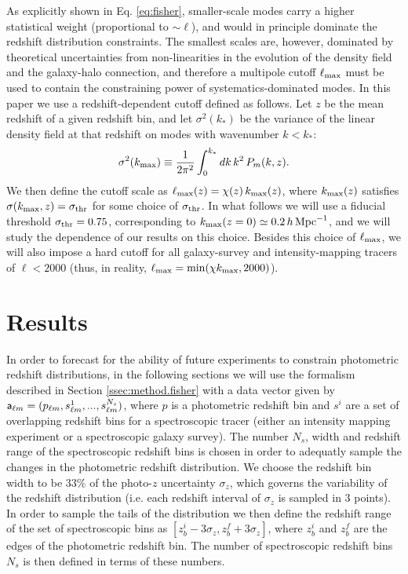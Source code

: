 \documentclass[prd,twocolumn]{revtex4}
\begin{document}
    As explicitly shown in Eq. \ref{eq:fisher}, smaller-scale modes carry a higher statistical
    weight (proportional to $\sim\ell$), and would in principle dominate the redshift
    distribution constraints. The smallest scales are, however, dominated by theoretical
    uncertainties from non-linearities in the evolution of the density field and the galaxy-halo
    connection, and therefore a multipole cutoff $\ell_{\rm max}$ must be used to contain
    the constraining power of systematics-dominated modes. In this paper we use a
    redshift-dependent cutoff defined as follows. Let $z$ be the mean redshift of a given
    redshift bin, and let $\sigma^2(k_*)$ be the variance of the linear density field
    at that redshift on modes with wavenumber $k<k_*$:
    \begin{equation}
      \sigma^2(k_{\rm max})\equiv\frac{1}{2\pi^2}\int_0^{k_*}dk\,k^2\,P_m(k,z).
    \end{equation}
    We then define the cutoff scale as $\ell_{\rm max}(z)=\chi(z)\,k_{\rm max}(z)$,
    where $k_{\rm max}(z)$ satisfies $\sigma(k_{\rm max},z)=\sigma_{\rm thr}$ for some
    choice of $\sigma_{\rm thr}$. In what follows we will use a fiducial threshold
    $\sigma_{\rm thr}=0.75$, corresponding to $k_{\rm max}(z=0)\simeq0.2\,h\,{\rm Mpc}^{-1}$,
    and we will study the dependence of our results on this choice. Besides this choice of
    $\ell_{\rm max}$, we will also impose a hard cutoff for all galaxy-survey and
    intensity-mapping tracers of $\ell<2000$ (thus, in reality,
    $\ell_{\rm max}={\rm min}(\chi k_{\rm max},2000)$).

\section{Results} \label{sec:results}
  In order to forecast for the ability of future experiments to constrain photometric
  redshift distributions, in the following sections we will use the formalism 
  described in Section \ref{ssec:method.fisher} with a data vector given by
  ${\sf a}_{\ell m}=(p_{\ell m},s^1_{\ell m},...,s^{N_s}_{\ell m})$, where $p$ is
  a photometric redshift bin and $s^i$ are a set of overlapping redshift bins for
  a spectroscopic tracer (either an intensity mapping experiment or a spectroscopic
  galaxy survey). The number $N_s$, width and redshift range of the spectroscopic
  redshift bins is chosen in order to adequatly sample the changes in the photometric
  redshift distribution. We choose the redshift bin width to be $33\%$ of the
  photo-$z$ uncertainty $\sigma_z$, which governs the variability of the redshift
  distribution (i.e. each redshift interval of $\sigma_z$ is sampled in 3 points).
  In order to sample the tails of the distribution we then define the redshift 
  range of the set of spectroscopic bins as $[z_b^i-3\sigma_z,z_b^f+3\sigma_z]$,
  where $z_b^i$ and $z_b^f$ are the edges of the photometric redshift bin. The
  number of spectroscopic redshift bins $N_s$ is then defined in terms of these
  numbers.
  
\end{document}

